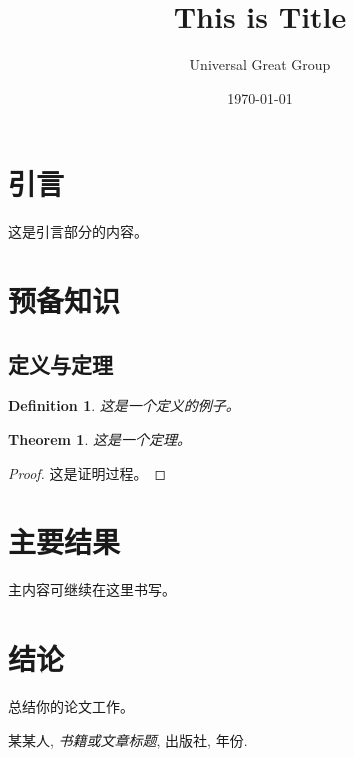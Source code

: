\documentclass[12pt, a4paper]{article}
\title{\Huge\bfseries This is Title}
\author{\Large Universal Great Group}
\date{\Large \today}
\newtheorem{theorem}{Theorem}[section]
\newtheorem{definition}{Definition}[section]
\begin{document}
\maketitle
\thispagestyle{empty} %
\newpage

\tableofcontents
\newpage

\section{引言}

这是引言部分的内容。

\section{预备知识}

\subsection{定义与定理}

\begin{definition}
这是一个定义的例子。
\end{definition}

\begin{theorem}
这是一个定理。
\end{theorem}

\begin{proof}
这是证明过程。
\end{proof}

\section{主要结果}

主内容可继续在这里书写。

\section{结论}

总结你的论文工作。

\newpage
\begin{thebibliography}{9}
 某某人, \emph{书籍或文章标题}, 出版社, 年份.
\end{thebibliography}
\end{document}
